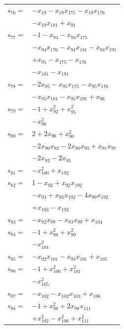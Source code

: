 \begin{longtable}{@{}r@{\;}l@{}}
\(s_{76}=\) & \(\displaystyle -x_{19} -x_{19}x_{175} -x_{19}x_{176}\) \\
 & \(\displaystyle -x_{19}x_{181} +x_{91}\) \\[3pt]
\(s_{77}=\) & \(\displaystyle -1 -x_{94} -x_{94}x_{175}\) \\
 & \(\displaystyle -x_{94}x_{176} -x_{94}x_{181} -x_{94}x_{191}\) \\
 & \(\displaystyle +x_{95} -x_{175} -x_{176}\) \\
 & \(\displaystyle -x_{181} -x_{191}\) \\[3pt]
\(s_{78}=\) & \(\displaystyle -2x_{95} -x_{95}x_{175} -x_{95}x_{176}\) \\
 & \(\displaystyle -x_{95}x_{181} -x_{95}x_{191} +x_{96}\) \\[3pt]
\(s_{79}=\) & \(\displaystyle -1 +x_{92}^{2} +x_{95}^{2}\) \\
 & \(\displaystyle -x_{96}^{2}\) \\[3pt]
\(s_{80}=\) & \(\displaystyle 2 +2x_{90} +x_{90}^{2}\) \\
 & \(\displaystyle -2x_{90}x_{92} -2x_{90}x_{93} +x_{91}x_{97}\) \\
 & \(\displaystyle -2x_{92} -2x_{93}\) \\[3pt]
\(s_{81}=\) & \(\displaystyle -x_{100}^{2} +x_{192}\) \\[3pt]
\(s_{82}=\) & \(\displaystyle 1 -x_{92} +x_{92}x_{192}\) \\
 & \(\displaystyle -x_{93} +x_{93}x_{192} -4x_{99}x_{192}\) \\
 & \(\displaystyle +x_{103} -x_{192}\) \\[3pt]
\(s_{83}=\) & \(\displaystyle -x_{92}x_{99} -x_{93}x_{99} +x_{104}\) \\[3pt]
\(s_{84}=\) & \(\displaystyle -1 +x_{98}^{2} +x_{99}^{2}\) \\
 & \(\displaystyle -x_{104}^{2}\) \\[3pt]
\(s_{85}=\) & \(\displaystyle -x_{92}x_{101} -x_{93}x_{101} +x_{105}\) \\[3pt]
\(s_{86}=\) & \(\displaystyle -1 +x_{100}^{2} +x_{101}^{2}\) \\
 & \(\displaystyle -x_{105}^{2}\) \\[3pt]
\(s_{87}=\) & \(\displaystyle -x_{102} -x_{102}x_{103} +x_{106}\) \\[3pt]
\(s_{88}=\) & \(\displaystyle -1 +x_{98}^{2} +2x_{98}x_{111}\) \\
 & \(\displaystyle +x_{102}^{2} -x_{106}^{2} +x_{111}^{2}\) \\[3pt]

\end{longtable}

